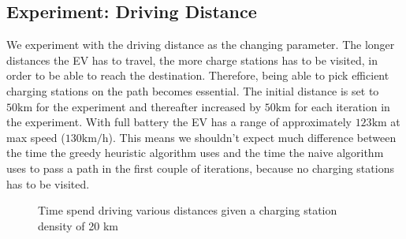 \subsection{Experiment: Driving Distance}

We experiment with the driving distance as the changing parameter. The longer distances the EV has to travel, the more charge stations has to be visited, in order to be able to reach the destination. Therefore, being able to pick efficient charging stations on the path becomes essential. The initial distance is set to $50 \si{\km}$ for the experiment and thereafter increased by $50 \si{\km}$ for each iteration in the experiment. With full battery the EV has a range of approximately $123 \si{\km}$ at max speed ($130 \si{\km\per\hour}$). This means we shouldn't expect much difference between the time the greedy heuristic algorithm uses and the time the naive algorithm uses to pass a path in the first couple of iterations, because no charging stations has to be visited.  

\begin{figure}
\centering
{}
\caption{Time spend driving various distances given a charging station density of 20 km} 
\label{fig:charge_rate}
\end{figure}